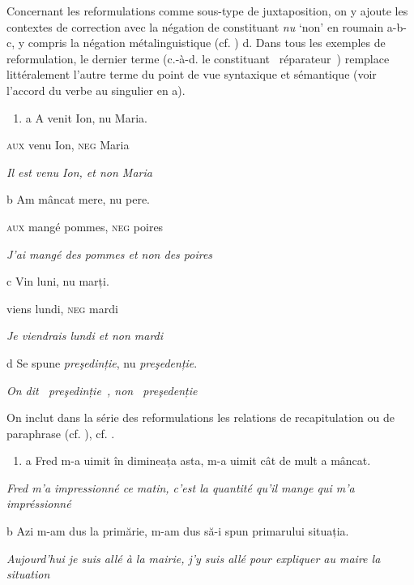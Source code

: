 Concernant les reformulations comme sous-type de juxtaposition, on y ajoute les contextes de correction avec la négation de constituant \textit{nu} `non' en roumain a-b-c, y compris la négation métalinguistique (cf. \citet{Zafiu2005}) d. Dans tous les exemples de reformulation, le dernier terme (c.-à-d. le constituant {\guillemotleft}~réparateur~{\guillemotright}) remplace littéralement l'autre terme du point de vue syntaxique et sémantique (voir l'accord du verbe au singulier en a).


\begin{enumerate}
\item \label{bkm:Ref273693866}a  A  venit  Ion,  nu  Maria.


\end{enumerate}
\textsc{aux}  venu  Ion,  \textsc{neg}  Maria

{\itshape
Il est venu Ion, et non Maria}

  b  Am  mâncat  mere,  nu  pere.

    \textsc{aux}  mangé  pommes,  \textsc{neg}  poires

{\itshape
J'ai mangé des pommes et non des poires}

  c  Vin  luni,  nu  marți.

    viens  lundi,  \textsc{neg } mardi

{\itshape
Je viendrais lundi et non mardi}

  d  Se spune \textit{preşedinție}, nu \textit{preşedenție}.

    \textit{On dit {\guillemotleft}~preşedinție~{\guillemotright}, non {\guillemotleft}~preşedenție~{\guillemotright}}

On inclut dans la série des reformulations les relations de recapitulation ou de paraphrase (cf. \citet[387]{Longacre2007}), cf. . 


\begin{enumerate}
\item \label{bkm:Ref301431913}a  Fred m-a uimit în dimineața asta, m-a uimit cât de mult a mâncat.


\end{enumerate}
{\itshape
Fred m'a impressionné ce matin, c'est la quantité qu'il mange qui m'a impréssionné}

  b  Azi m-am dus la primărie, m-am dus să-i spun primarului situația.

{\itshape
Aujourd'hui je suis allé à la mairie, j'y suis allé pour expliquer au maire la situation}

